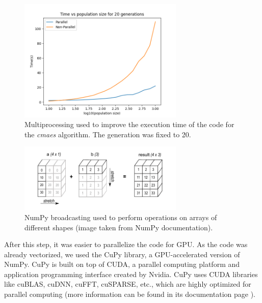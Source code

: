 \medskip

\begin{figure}[h]
    \centering
    \includegraphics[width=0.7\textwidth]{images/multiprocessing.png}
    \caption{Multiprocessing used to improve the execution time of the code for the \textit{cmaes} algorithm. The generation was fixed to 20.}
\end{figure}

\begin{figure}[h]
    \centering
    \includegraphics[width=0.7\textwidth]{images/broadcasting.png}
    \caption{NumPy broadcasting used to perform operations on arrays of different shapes (image taken from NumPy documentation).}
    \label{fig:broadcasting}
\end{figure}

\FloatBarrier

After this step, it was easier to parallelize the code for GPU. As the code was already vectorized, we used the CuPy library, a GPU-accelerated 
version of NumPy. CuPy is built on top of CUDA, a parallel computing platform and application programming interface created by Nvidia. CuPy uses 
CUDA libraries like cuBLAS, cuDNN, cuFFT, cuSPARSE, etc., which are highly optimized for parallel computing (more information can be found in its 
documentation page \cite{cupy}).

